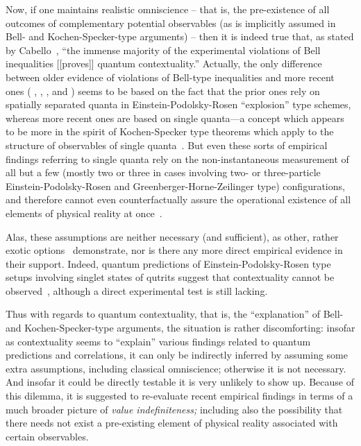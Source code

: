 \documentclass[runningheads]{llncs}
\begin{document}
Now, if one maintains realistic omniscience --
that is, the pre-existence of all outcomes of complementary potential observables
(as is implicitly assumed in Bell- and Kochen-Specker-type arguments)
--  then it is indeed true that,
as stated by Cabello~\cite{cabello:210401},
``the immense majority of the experimental violations of Bell inequalities [[proves]] quantum contextuality.''
Actually, the only difference between older evidence of violations of Bell-type inequalities
and more recent ones (
\cite{hasegawa:230401},
\cite{Bartosik-09},
\cite{kirch-09},
\cite{PhysRevLett.103.160405} and
\cite{Lapkiewicz-11}
)
seems to be based on the fact that the prior ones rely on spatially separated
quanta in Einstein-Podolsky-Rosen ``explosion'' type schemes,
whereas more recent ones are based on single quanta---a concept which appears to be more in the spirit of Kochen-Specker type theorems which
apply to the structure of observables of single quanta~\cite{cabello-nature-2011}.
But even these sorts of empirical findings referring to single quanta rely on the
non-instantaneous measurement of all but a few (mostly two or three in cases involving two- or three-particle
Einstein-Podolsky-Rosen and Greenberger-Horne-Zeilinger type) configurations,
and therefore cannot even counterfactually assure the operational existence of all elements of physical reality at once~\cite{svozil-2006-uniquenessprinciple}.

Alas, these assumptions are neither necessary (and sufficient),
as other, rather exotic options~\cite{pitowsky-82,meyer:99} demonstrate,
nor is there any more direct empirical evidence in their support.
Indeed, quantum predictions of Einstein-Podolsky-Rosen type setups involving
singlet states of qutrits suggest that contextuality
cannot be observed~\cite{svozil:040102}, although a direct experimental test is still lacking.

Thus with regards to quantum contextuality,
that is, the ``explanation'' of Bell- and Kochen-Specker-type arguments,
 the situation is rather discomforting:
insofar as contextuality seems to ``explain''
various findings related to quantum predictions and correlations,
it can only be indirectly inferred by assuming some extra assumptions, including classical omniscience;
otherwise it is not necessary.
And insofar it could be directly testable it is very unlikely to show up.
Because of this dilemma,
it is suggested to re-evaluate recent empirical findings in terms of a much broader picture
of {\em value indefiniteness;} including also the possibility
that there needs not exist a pre-existing element of physical reality
associated with certain observables.
\end{document}
